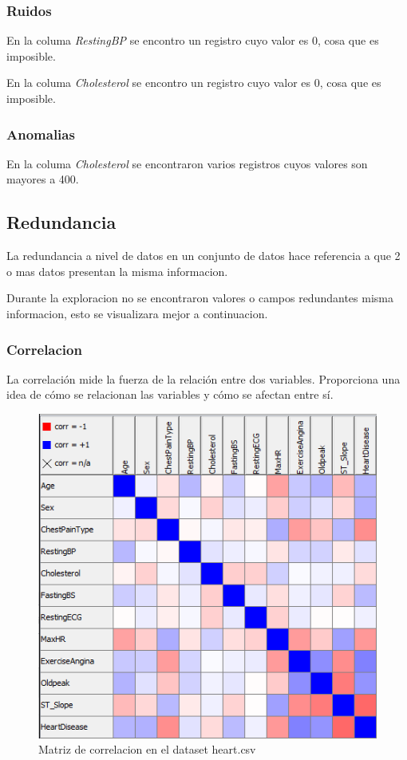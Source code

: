 \documentclass[12pt, letterpaper]{article}
\begin{document}
\subsubsection{Ruidos}
En la columa \textit{RestingBP} se encontro un registro cuyo valor es 0, cosa que es imposible.

En la columa \textit{Cholesterol} se encontro un registro cuyo valor es 0, cosa que es imposible.

\subsubsection{Anomalias}
En la columa \textit{Cholesterol} se encontraron varios registros cuyos valores son mayores a 400.


\subsection{Redundancia}
La redundancia a nivel de datos en un conjunto de datos hace referencia a que 2 o mas datos
presentan la misma informacion.

Durante la exploracion no se encontraron valores o campos redundantes
misma informacion, esto se visualizara mejor a continuacion.
\subsubsection{Correlacion}
La correlación mide la fuerza de la relación entre dos variables. 
Proporciona una idea de cómo se relacionan las variables y cómo se afectan entre sí. 
\cite{correlacion}

\begin{figure}
    \centering
    \includegraphics[scale=1]{correlacion.png}
    \caption{Matriz de correlacion en el dataset heart.csv}
    \label{fig:correlacion}
\end{figure}
\end{document}
